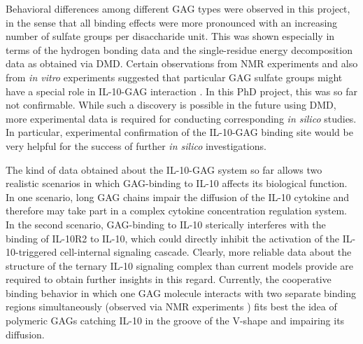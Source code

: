 
Behavioral differences among different GAG types were observed in this project,
in the sense that all binding effects were more pronounced with an increasing
number of sulfate groups per disaccharide unit. This was shown especially in
terms of the hydrogen bonding data and the single-residue energy decomposition
data as obtained via DMD. Certain observations from NMR experiments and also
from \textit{in vitro} experiments suggested that particular GAG sulfate groups
might have a special role in IL-10-GAG interaction \cite{salek_ardakani_2000,
kuenze_gehrcke_2014}. In this PhD project, this was so far not confirmable.
While such a discovery is possible in the future using DMD, more experimental
data is required for conducting corresponding \textit{in silico} studies. In
particular, experimental confirmation of the IL-10-GAG binding site would be
very helpful for the success of further \textit{in silico} investigations.

The kind of data obtained about the IL-10-GAG system so far allows two realistic
scenarios in which GAG-binding to IL-10 affects its biological function. In one
scenario, long GAG chains impair the diffusion of the IL-10 cytokine and
therefore may take part in a complex cytokine concentration regulation system.
In the second scenario, GAG-binding to IL-10 sterically interferes with the
binding of IL-10R2 to IL-10, which could directly inhibit the activation of the
IL-10-triggered cell-internal signaling cascade. Clearly, more reliable data
about the structure of the ternary IL-10 signaling complex than current models
provide are required to obtain further insights in this regard. Currently, the
cooperative binding behavior in which one GAG molecule interacts with two
separate binding regions simultaneously (observed via NMR experiments
\cite{kuenze_gehrcke_2014}) fits best the idea of polymeric GAGs catching IL-10
in the groove of the V-shape and impairing its diffusion.

